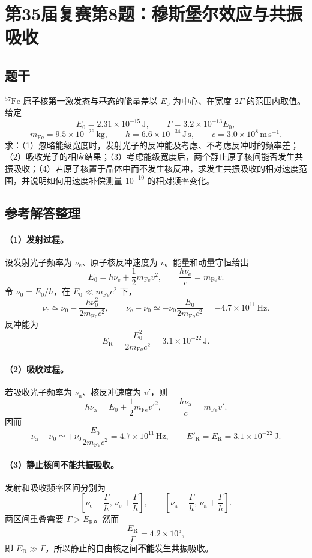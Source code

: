 \section{第35届复赛第8题：穆斯堡尔效应与共振吸收}
\subsection{题干}
$^{57}\mathrm{Fe}$ 原子核第一激发态与基态的能量差以 $E_0$ 为中心、在宽度 $2\Gamma$ 的范围内取值。给定
\[
E_0=2.31\times10^{-15}\,\mathrm J,\qquad
\Gamma=3.2\times10^{-13}E_0,
\]
\[
m_{\mathrm{Fe}}=9.5\times10^{-26}\,\mathrm{kg},\qquad
h=6.6\times10^{-34}\,\mathrm{J\,s},\qquad
c=3.0\times10^8\,\mathrm{m\,s^{-1}}.
\]
求：（1）忽略能级宽度时，发射光子的反冲能及考虑、不考虑反冲时的频率差；（2）吸收光子的相应结果；（3）考虑能级宽度后，两个静止原子核间能否发生共振吸收；（4）若原子核置于晶体中而不发生核反冲，求发生共振吸收的相对速度范围，并说明如何用速度补偿测量 $10^{-10}$ 的相对频率变化。

\subsection{参考解答整理}
\paragraph{（1）发射过程。} 设发射光子频率为 $\nu_{\mathrm e}$、原子核反冲速度为 $v$。能量和动量守恒给出
\[
E_0=h\nu_{\mathrm e}+\frac12m_{\mathrm{Fe}}v^2,\qquad
\frac{h\nu_{\mathrm e}}{c}=m_{\mathrm{Fe}}v.
\]
令 $\nu_0=E_0/h$，在 $E_0\ll m_{\mathrm{Fe}}c^2$ 下，
\[
\nu_{\mathrm e}\simeq\nu_0-\frac{h\nu_0^2}{2m_{\mathrm{Fe}}c^2},
\qquad
\nu_{\mathrm e}-\nu_0\simeq-\nu_0\frac{E_0}{2m_{\mathrm{Fe}}c^2}
=\boxed{-4.7\times10^{11}\,\mathrm{Hz}}.
\]
反冲能为
\[
E_{\mathrm R}=\frac{E_0^2}{2m_{\mathrm{Fe}}c^2}
=\boxed{3.1\times10^{-22}\,\mathrm J}.
\]

\paragraph{（2）吸收过程。} 若吸收光子频率为 $\nu_{\mathrm a}$、核反冲速度为 $v'$，则
\[
h\nu_{\mathrm a}=E_0+\frac12m_{\mathrm{Fe}}v'^2,\qquad
\frac{h\nu_{\mathrm a}}{c}=m_{\mathrm{Fe}}v'.
\]
因而
\[
\nu_{\mathrm a}-\nu_0\simeq+\nu_0\frac{E_0}{2m_{\mathrm{Fe}}c^2}
=\boxed{4.7\times10^{11}\,\mathrm{Hz}},
\qquad
E'_{\mathrm R}=E_{\mathrm R}=\boxed{3.1\times10^{-22}\,\mathrm J}.
\]

\paragraph{（3）静止核间不能共振吸收。} 发射和吸收频率区间分别为
\[
\left[\nu_{\mathrm e}-\frac{\Gamma}{h},\,\nu_{\mathrm e}+\frac{\Gamma}{h}\right],
\qquad
\left[\nu_{\mathrm a}-\frac{\Gamma}{h},\,\nu_{\mathrm a}+\frac{\Gamma}{h}\right].
\]
两区间重叠需要 $\Gamma>E_{\mathrm R}$。然而
\[
\frac{E_{\mathrm R}}{\Gamma}=4.2\times10^5,
\]
即 $E_{\mathrm R}\gg\Gamma$，所以静止的自由核之间\textbf{不能}发生共振吸收。

